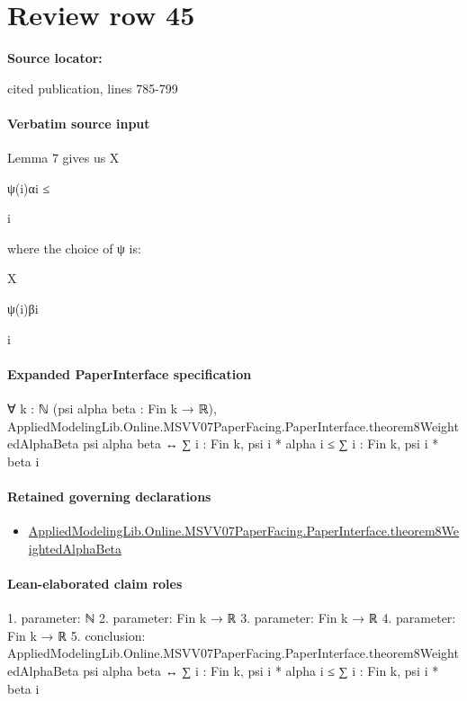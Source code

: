 \documentclass[10pt]{article}
\begin{document}
\section*{Review row 45}
\textbf{Source locator:} {\footnotesize\raggedright cited publication, lines 785-\allowbreak{}799\par}
\paragraph{Verbatim source input}
\begin{ReviewVerbatim}
Lemma 7 gives us
X

ψ(i)αi ≤

i

where the choice of ψ is:

X

ψ(i)βi

i
\end{ReviewVerbatim}



\paragraph{Expanded PaperInterface specification}
\begin{ReviewVerbatim}
∀ {k : ℕ} (psi alpha beta : Fin k → ℝ),
  AppliedModelingLib.Online.MSVV07PaperFacing.PaperInterface.theorem8WeightedAlphaBeta psi alpha beta ↔
    ∑ i : Fin k, psi i * alpha i ≤ ∑ i : Fin k, psi i * beta i
\end{ReviewVerbatim}

\paragraph{Retained governing declarations}
\begin{itemize}\raggedright
\item \hyperlink{governing-declaration-96646e64e72b1404}{Applied\allowbreak{}Modeling\allowbreak{}Lib.\allowbreak{}Online.\allowbreak{}MSVV07\allowbreak{}Paper\allowbreak{}Facing.\allowbreak{}Paper\allowbreak{}Interface.\allowbreak{}theorem8\allowbreak{}Weighted\allowbreak{}Alpha\allowbreak{}Beta}
\end{itemize}
\paragraph{Lean-elaborated claim roles}\begin{ReviewVerbatim}
1. parameter: ℕ
2. parameter: Fin k → ℝ
3. parameter: Fin k → ℝ
4. parameter: Fin k → ℝ
5. conclusion: AppliedModelingLib.Online.MSVV07PaperFacing.PaperInterface.theorem8WeightedAlphaBeta psi alpha beta ↔
  ∑ i : Fin k, psi i * alpha i ≤ ∑ i : Fin k, psi i * beta i
\end{ReviewVerbatim}
\end{document}
